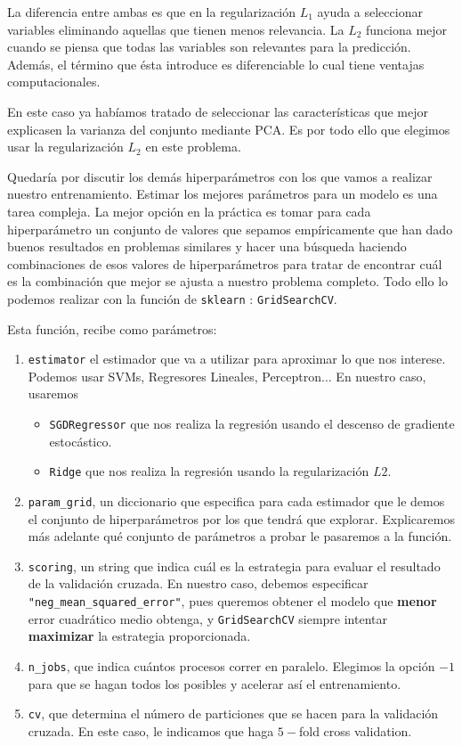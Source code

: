 \documentclass[a4paper, 20pt]{article}
\begin{document}
La diferencia entre ambas es que en la regularización $L_1$ ayuda a seleccionar variables eliminando aquellas que tienen menos relevancia. La $L_2$ funciona mejor cuando se piensa que todas las variables son relevantes para la predicción. Además, el término que ésta introduce es diferenciable lo cual tiene ventajas computacionales. 

En este caso ya habíamos tratado de seleccionar las características que mejor explicasen la varianza del conjunto mediante PCA. Es por todo ello que elegimos usar la regularización $L_2$ en este problema. 


Quedaría por discutir los demás hiperparámetros con los que vamos a realizar nuestro entrenamiento. Estimar los mejores parámetros para un modelo es una tarea compleja. La mejor opción en la práctica es tomar para cada hiperparámetro un conjunto de valores que sepamos empíricamente que han dado buenos resultados en problemas similares y hacer una búsqueda haciendo combinaciones de esos valores de hiperparámetros para tratar de encontrar cuál es la combinación que mejor se ajusta a nuestro problema completo. Todo ello lo podemos realizar con la función de \lstinline{sklearn} :  \lstinline{GridSearchCV}.

Esta función, recibe como parámetros:
\begin{enumerate}
\item \lstinline{estimator} el estimador que va a utilizar para aproximar lo que nos interese. Podemos usar SVMs, Regresores Lineales, Perceptron... En nuestro caso, usaremos
  \begin{itemize}
  \item \lstinline{SGDRegressor} que nos realiza la regresión usando el descenso de gradiente estocástico.
  \item \lstinline{Ridge} que nos realiza la regresión usando la regularización $L2$.
  \end{itemize}
\item \lstinline{param_grid}, un diccionario que especifica para cada estimador que le demos el conjunto de hiperparámetros por los que tendrá que explorar. Explicaremos más adelante qué conjunto de parámetros a probar le pasaremos a la función.
\item \lstinline{scoring}, un string que indica cuál es la estrategia para evaluar el resultado de la validación cruzada. En nuestro caso, debemos especificar \lstinline{"neg_mean_squared_error"}, pues queremos obtener el modelo que \textbf{menor} error cuadrático medio obtenga, y \lstinline{GridSearchCV} siempre intentar \textbf{maximizar} la estrategia proporcionada.
\item \lstinline{n_jobs}, que indica cuántos procesos correr en paralelo. Elegimos la opción $-1$ para que se hagan todos los posibles y acelerar así el entrenamiento.

  \item \lstinline{cv}, que determina el número de particiones que se hacen para la validación cruzada. En este caso, le indicamos que haga $5-$fold cross validation.

\end{enumerate}
\end{document}
